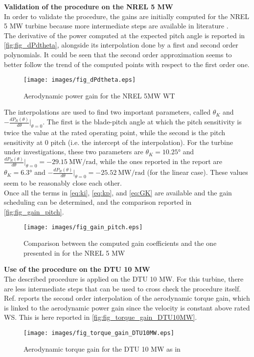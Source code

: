 \textbf{Validation of the procedure on the NREL 5 MW}\\ 
In order to validate the procedure, the gains are initially computed for the NREL 5 MW turbine because more intermediate steps are available in literature \cite{NREL_5MW_reference}.\\
The derivative of the power computed at the expected pitch angle is  reported in \autoref{fig:fig_dPdtheta}, alongside its interpolation done by a first and second order polynomials. It could be seen that the second order approximation seems to better follow the trend of the computed points with respect to the first order one. 
\begin{figure}[H]
    \centering
    \texttt{[image: images/fig\_dPdtheta.eps]}
    \caption{Aerodynamic power gain for the NREL 5MW WT}
    \label{fig:fig_dPdtheta}
\end{figure}

The interpolations are used to find two important parameters, called $\theta_{K}$ and  $-\frac{dP_R(\theta)}{d\theta}\vert_{\theta=0}$. The first is the blade-pitch angle at which the pitch sensitivity is twice the value at the rated operating point, while the second is the pitch sensitivity at 0 pitch (i.e. the intercept of the interpolation). For the turbine under investigations, these two parameters are $\theta_K=10.25 \si{\degree}$ and  $\frac{dP_R(\theta)}{d\theta}\vert_{\theta=0} = -29.15 \ \si{\mega\watt\per\radian}$, while the ones reported in the report are $\theta_K=6.3 \si{\degree}$ and  $-\frac{dP_R(\theta)}{d\theta}\vert_{\theta=0} = -25.52 \ \si{\mega\watt\per\radian}$ (for the linear case). These values seem to be reasonably close each other.\\ 
Once all the terms in \autoref{eq:ki}, \ref{eq:kp}, and \ref{eq:GK} are available and the gain scheduling can be determined, and the comparison reported in \autoref{fig:fig_gain_pitch}.
\begin{figure}[H]
    \centering
    \texttt{[image: images/fig\_gain\_pitch.eps]}
    \caption{Comparison between the computed gain coefficients and the one presented in \cite{NREL_5MW_reference} for the NREL 5 MW}
    \label{fig:fig_gain_pitch}
\end{figure}


\textbf{Use of the procedure on the DTU 10 MW}\\ 
The described procedure is applied on the DTU 10 MW. For this turbine, there are less intermediate steps that can be used to cross check the procedure itself. Ref. \cite{DTU_Wind_Energy_E_0028} reports the second order interpolation of the aerodynamic torque gain, which is linked to the aerodynamic power gain since the velocity is constant above rated WS. This is here reported in \autoref{fig:fig_torque_gain_DTU10MW}.
\begin{figure}[H]
    \centering
    \texttt{[image: images/fig\_torque\_gain\_DTU10MW.eps]}
    \caption{Aerodynamic torque gain for the DTU 10 MW as in \cite{DTU_Wind_Energy_E_0028}}
    \label{fig:fig_torque_gain_DTU10MW}
\end{figure}


